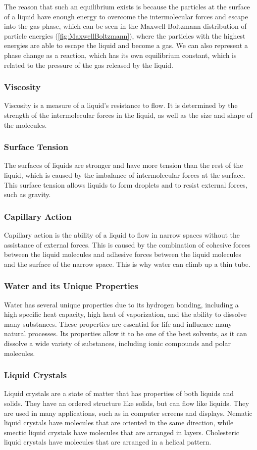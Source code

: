The reason that such an equilibrium exists is because the particles at the surface of a liquid have enough energy to overcome the intermolecular forces and escape into the gas phase, which can be seen in the Maxwell-Boltzmann distribution of particle energies (\ref{fig:MaxwellBoltzmann}), where the particles with the highest energies are able to escape the liquid and become a gas. We can also represent a phase change as a reaction, which has its own equilibrium constant, which is related to the pressure of the gas released by the liquid. 
\subsubsection{Viscosity}
Viscosity is a measure of a liquid's resistance to flow. It is determined by the strength of the intermolecular forces in the liquid, as well as the size and shape of the molecules.
\subsubsection{Surface Tension}
The surfaces of liquids are stronger and have more tension than the rest of the liquid, which is caused by the imbalance of intermolecular forces at the surface. This surface tension allows liquids to form droplets and to resist external forces, such as gravity. 
\subsubsection{Capillary Action}
Capillary action is the ability of a liquid to flow in narrow spaces without the assistance of external forces. This is caused by the combination of cohesive forces between the liquid molecules and adhesive forces between the liquid molecules and the surface of the narrow space. This is why water can climb up a thin tube.
\subsubsection{Water and its Unique Properties}
Water has several unique properties due to its hydrogen bonding, including a high specific heat capacity, high heat of vaporization, and the ability to dissolve many substances. These properties are essential for life and influence many natural processes. Its properties allow it to be one of the best solvents, as it can dissolve a wide variety of substances, including ionic compounds and polar molecules. 
\subsubsection{Liquid Crystals}
Liquid crystals are a state of matter that has properties of both liquids and solids. They have an ordered structure like solids, but can flow like liquids. They are used in many applications, such as in computer screens and displays. Nematic liquid crystals have molecules that are oriented in the same direction, while smectic liquid crystals have molecules that are arranged in layers. Cholesteric liquid crystals have molecules that are arranged in a helical pattern.
